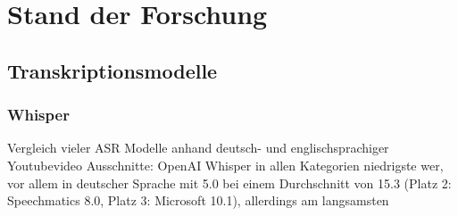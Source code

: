 \chapter{Stand der Forschung}\label{ch:relatedWork}




\section{Transkriptionsmodelle}


\subsection{Whisper}
Vergleich vieler ASR Modelle anhand deutsch- und englischsprachiger Youtubevideo Ausschnitte: OpenAI Whisper in allen Kategorien niedrigste \ac{wer}, vor allem in deutscher Sprache mit 5.0 bei einem Durchschnitt von 15.3 (Platz 2: Speechmatics 8.0, Platz 3: Microsoft 10.1), allerdings am langsamsten \citet{VergleichASR2023}


